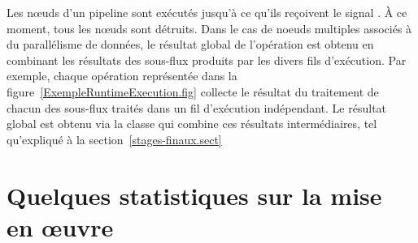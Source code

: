%
%


Les nœuds d'un pipeline sont ex\'ecut\'es jusqu'\`a ce qu'ils re\c coivent le signal . \`A ce moment, tous les nœuds sont d\'etruits. Dans le cas de noeuds multiples associ\'es \`a du parall\'elisme de donn\'ees, le r\'esultat global de l'op\'eration est obtenu en combinant les r\'esultats des sous-flux produits par les divers fils d'ex\'ecution. Par exemple, chaque op\'eration  repr\'esent\'ee dans la figure~\ref{ExempleRuntimeExecution.fig} collecte le r\'esultat du traitement de chacun des sous-flux trait\'es dans un fil d'ex\'ecution ind\'ependant. Le r\'esultat global est obtenu via la classe  qui combine ces r\'esultats interm\'ediaires, tel qu'expliqu\'e \`a la section~\ref{stages-finaux.sect}


\section{Quelques statistiques sur la mise en \oe{}uvre}

